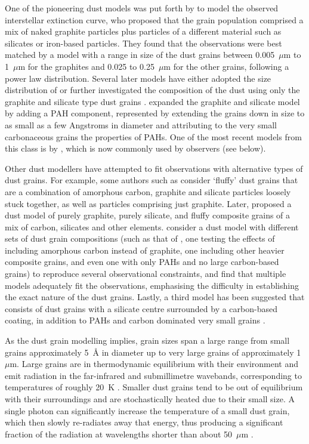 One of the pioneering dust models was put forth by \citet{1977ApJ...217..425M} to model the observed interstellar extinction curve, who proposed that the grain population comprised a mix of naked graphite particles plus particles of a different material such as silicates or iron-based particles.  They found that the observations were best matched by a model with a range in size of the dust grains between 0.005~$\mu$m to 1~$\mu$m for the graphites and 0.025 to 0.25~$\mu$m for the other grains, following a power law distribution.  Several later models have either adopted the size distribution of \citet{1977ApJ...217..425M} or further investigated the composition of the dust using only the graphite and silicate type dust grains \citep[e.g. ][]{1984ApJ...285...89D, 1994ApJ...422..164K}.  \citet{2001ApJ...554..778L} expanded the graphite and silicate model by adding a PAH component, represented by extending the grains down in size to as small as a few Angstroms in diameter and attributing to the very small carbonaceous grains the properties of PAHs.  One of the most recent models from this class is by \citet{2007ApJ...657..810D}, which is now commonly used by observers (see below).

Other dust modellers have attempted to fit observations with alternative types of dust grains.  For example, some authors such as \citet{1989ApJ...341..808M} consider `fluffy' dust grains that are a combination of amorphous carbon, graphite and silicate particles loosely stuck together, as well as particles comprising just graphite. Later, \citet{1996ApJ...472..643M} proposed a dust model of purely graphite, purely silicate, and fluffy composite grains of a mix of carbon, silicates and other elements. \citet{2004ApJS..152..211Z} consider a dust model with different sets of dust grain compositions (such as that of \citet{2001ApJ...554..778L}, one testing the effects of including amorphous carbon instead of graphite, one including other heavier composite grains, and even one with only PAHs and no large carbon-based grains) to reproduce several observational constraints, and find that multiple models adequately fit the observations, emphasising the difficulty in establishing the exact nature of the dust grains.  Lastly, a third model has been suggested that consists of dust grains with a silicate centre surrounded by a carbon-based coating, in addition to PAHs and carbon dominated very small grains \citep[e.g.][]{1990A&A...237..215D}.

As the dust grain modelling implies, grain sizes span a large range from small grains approximately 5~$\mbox{\AA}$ in diameter up to very large grains of approximately 1~$\mu$m.  Large grains are in thermodynamic equilibrium with their environment and emit radiation in the far-infrared and submillimetre wavebands, corresponding to temperatures of roughly 20~K \citep{2003ARA&A..41..241D}.  Smaller dust grains tend to be out of equilibrium with their surroundings and are stochastically heated due to their small size.  A single photon can significantly increase the temperature of a small dust grain, which then slowly re-radiates away that energy, thus producing a significant fraction of the radiation at wavelengths shorter than about 50~$\mu$m \citep{2003ARA&A..41..241D}.

